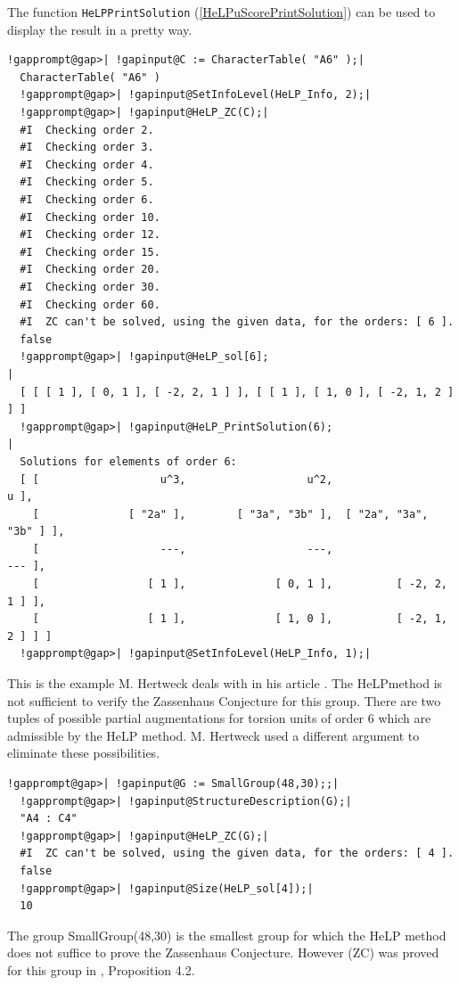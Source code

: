 \documentclass[a4paper,11pt]{report}
\begin{document}
{{ The function \texttt{HeLP{\textunderscore}PrintSolution} (\ref{HeLPuScorePrintSolution}) can be used to display the result in a pretty way. 
\begin{Verbatim}[commandchars=!@|,fontsize=\small,frame=single,label=Example]
  !gapprompt@gap>| !gapinput@C := CharacterTable( "A6" );|
  CharacterTable( "A6" )
  !gapprompt@gap>| !gapinput@SetInfoLevel(HeLP_Info, 2);|
  !gapprompt@gap>| !gapinput@HeLP_ZC(C);|
  #I  Checking order 2.
  #I  Checking order 3.
  #I  Checking order 4.
  #I  Checking order 5.
  #I  Checking order 6.
  #I  Checking order 10.
  #I  Checking order 12.
  #I  Checking order 15.
  #I  Checking order 20.
  #I  Checking order 30.
  #I  Checking order 60.
  #I  ZC can't be solved, using the given data, for the orders: [ 6 ].
  false
  !gapprompt@gap>| !gapinput@HeLP_sol[6];                                          |
  [ [ [ 1 ], [ 0, 1 ], [ -2, 2, 1 ] ], [ [ 1 ], [ 1, 0 ], [ -2, 1, 2 ] ] ]
  !gapprompt@gap>| !gapinput@HeLP_PrintSolution(6);                                |
  Solutions for elements of order 6:
  [ [                   u^3,                   u^2,                     u ],
    [              [ "2a" ],        [ "3a", "3b" ],  [ "2a", "3a", "3b" ] ],
    [                   ---,                   ---,                   --- ],
    [                 [ 1 ],              [ 0, 1 ],          [ -2, 2, 1 ] ],
    [                 [ 1 ],              [ 1, 0 ],          [ -2, 1, 2 ] ] ]
  !gapprompt@gap>| !gapinput@SetInfoLevel(HeLP_Info, 1);|
\end{Verbatim}
 This is the example M. Hertweck deals with in his article \cite{HerA6}. The HeLP\texttt{}method is not sufficient to verify the
Zassenhaus Conjecture for this group. There are two tuples of possible partial
augmentations for torsion units of order 6 which are admissible by the HeLP
method. M. Hertweck used a different argument to eliminate these
possibilities. 
\begin{Verbatim}[commandchars=!@|,fontsize=\small,frame=single,label=Example]
  !gapprompt@gap>| !gapinput@G := SmallGroup(48,30);;|
  !gapprompt@gap>| !gapinput@StructureDescription(G);|
  "A4 : C4"
  !gapprompt@gap>| !gapinput@HeLP_ZC(G);|
  #I  ZC can't be solved, using the given data, for the orders: [ 4 ].
  false
  !gapprompt@gap>| !gapinput@Size(HeLP_sol[4]);|
  10
\end{Verbatim}
 The group SmallGroup(48,30) is the smallest group for which the HeLP method
does not suffice to prove the Zassenhaus Conjecture. However (ZC) was proved
for this group in \cite{HoefertKimmerle}, Proposition 4.2. 
}}
\end{document}
